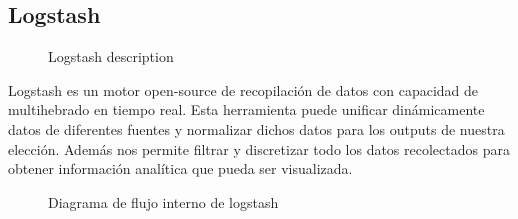 \subsection{Logstash}
\begin{figure}[H]
  \caption{Logstash description}
\end{figure}
Logstash es un motor open-source de recopilación de datos con capacidad de multihebrado en tiempo real. Esta herramienta puede unificar dinámicamente datos de diferentes fuentes y normalizar dichos datos para los outputs de nuestra elección. Además nos permite filtrar y discretizar todo los datos recolectados para obtener información analítica que pueda ser visualizada.\\

\begin{figure}[H]
  \caption{Diagrama de flujo interno de logstash}
\end{figure}

